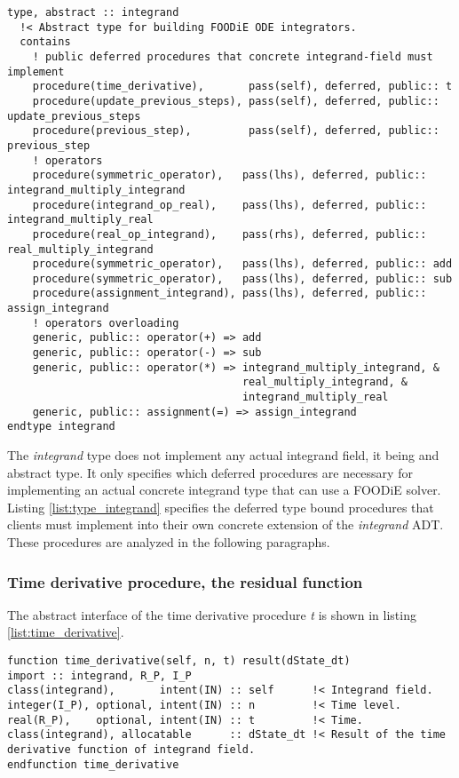 \documentclass[pdftex,preprint,3p,times,numbers]{elsarticle}
\begin{document}
\begin{lstlisting}[firstnumber=1,style=code,caption={integrand type definition},label={list:type_integrand}]
type, abstract :: integrand
  !< Abstract type for building FOODiE ODE integrators.
  contains
    ! public deferred procedures that concrete integrand-field must implement
    procedure(time_derivative),       pass(self), deferred, public:: t
    procedure(update_previous_steps), pass(self), deferred, public:: update_previous_steps
    procedure(previous_step),         pass(self), deferred, public:: previous_step
    ! operators
    procedure(symmetric_operator),   pass(lhs), deferred, public:: integrand_multiply_integrand
    procedure(integrand_op_real),    pass(lhs), deferred, public:: integrand_multiply_real
    procedure(real_op_integrand),    pass(rhs), deferred, public:: real_multiply_integrand
    procedure(symmetric_operator),   pass(lhs), deferred, public:: add
    procedure(symmetric_operator),   pass(lhs), deferred, public:: sub
    procedure(assignment_integrand), pass(lhs), deferred, public:: assign_integrand
    ! operators overloading
    generic, public:: operator(+) => add
    generic, public:: operator(-) => sub
    generic, public:: operator(*) => integrand_multiply_integrand, &
                                     real_multiply_integrand, &
                                     integrand_multiply_real
    generic, public:: assignment(=) => assign_integrand
endtype integrand
\end{lstlisting}

The \emph{integrand} type does not implement any actual integrand field, it being and abstract type. It only specifies which deferred procedures are necessary for implementing an actual concrete integrand type that can use a FOODiE solver. Listing \ref{list:type_integrand} specifies the deferred type bound procedures that clients must implement into their own concrete extension of the \emph{integrand} ADT. These procedures are analyzed in the following paragraphs.

\subsubsection{Time derivative procedure, the residual function}

The abstract interface of the time derivative procedure \emph{t} is shown in listing \ref{list:time_derivative}.

\begin{lstlisting}[firstnumber=1,style=code,caption={time derivative procedure interface},label={list:time_derivative}]
function time_derivative(self, n, t) result(dState_dt)
import :: integrand, R_P, I_P
class(integrand),       intent(IN) :: self      !< Integrand field.
integer(I_P), optional, intent(IN) :: n         !< Time level.
real(R_P),    optional, intent(IN) :: t         !< Time.
class(integrand), allocatable      :: dState_dt !< Result of the time derivative function of integrand field.
endfunction time_derivative
\end{lstlisting}
\end{document}
